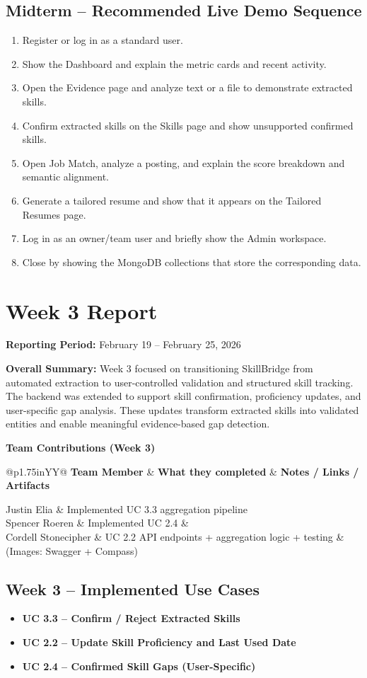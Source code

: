 \documentclass[11pt]{article}
\makeatletter
\newcommand{\WeekReport}[4]{
  \clearpage
  \section*{Week #1 Report}
  \addcontentsline{toc}{section}{Week #1 Report}
  \vspace{-0.25em}
  \noindent\textbf{Reporting Period:} #2

  \vspace{0.5em}
  \noindent\textbf{Overall Summary:} #3

  \vspace{0.75em}
  \noindent\textbf{Team Contributions (Week #1)}
  \vspace{0.25em}

  \begin{table}[H]
    \renewcommand{\arraystretch}{1.2}
    \begin{tabularx}{\linewidth}{@{}p{1.75in}YY@{}}
      \toprule
      \textbf{Team Member} & \textbf{What they completed} & \textbf{Notes / Links / Artifacts} \\
      \midrule
      #4
      \bottomrule
    \end{tabularx}
  \end{table}
}
\makeatother
\begin{document}
\subsection*{Midterm -- Recommended Live Demo Sequence}
\begin{enumerate}
  \item Register or log in as a standard user.
  \item Show the Dashboard and explain the metric cards and recent activity.
  \item Open the Evidence page and analyze text or a file to demonstrate extracted skills.
  \item Confirm extracted skills on the Skills page and show unsupported confirmed skills.
  \item Open Job Match, analyze a posting, and explain the score breakdown and semantic alignment.
  \item Generate a tailored resume and show that it appears on the Tailored Resumes page.
  \item Log in as an owner/team user and briefly show the Admin workspace.
  \item Close by showing the MongoDB collections that store the corresponding data.
\end{enumerate}

\WeekReport{3}{February 19 -- February 25, 2026}{
Week 3 focused on transitioning SkillBridge from automated extraction to user-controlled validation and structured skill tracking. The backend was extended to support skill confirmation, proficiency updates, and user-specific gap analysis. These updates transform extracted skills into validated entities and enable meaningful evidence-based gap detection.
}{
Justin Elia & Implemented UC 3.3 aggregation pipeline  \\
Spencer Roeren & Implemented UC 2.4 &  \\
Cordell Stonecipher & UC 2.2 API endpoints + aggregation logic + testing & (Images: Swagger + Compass) \\
}

\subsection*{Week 3 -- Implemented Use Cases}
\begin{itemize}
  \item \textbf{UC 3.3 – Confirm / Reject Extracted Skills}
  \item \textbf{UC 2.2 – Update Skill Proficiency and Last Used Date}
  \item \textbf{UC 2.4 – Confirmed Skill Gaps (User-Specific)}
\end{itemize}
\end{document}
